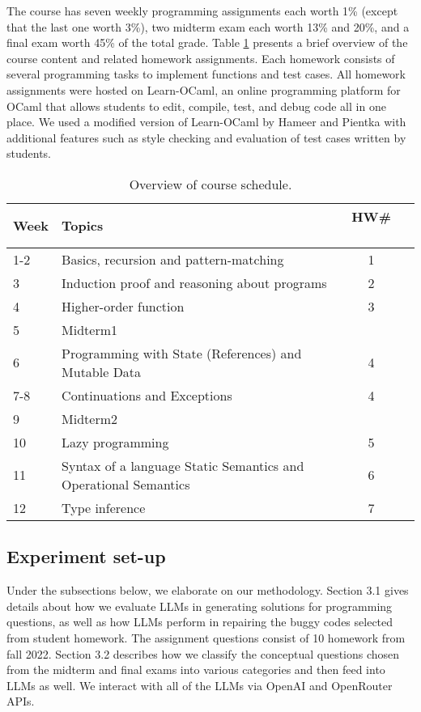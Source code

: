 The course has seven weekly programming assignments each worth 1\% (except that the last one worth 3\%), two midterm exam each worth 13\% and 20\%, and a final exam worth 45\% of the total grade. Table \ref{overview} presents a brief overview of the course content and related homework assignments. Each homework consists of several programming tasks to implement functions and test cases. All homework assignments were hosted on Learn-OCaml, an online programming platform for OCaml that allows students to edit, compile, test, and debug code all in one place. We used a modified version of Learn-OCaml \cite{10.1145/3341719} by Hameer and Pientka with additional features such as style checking and evaluation of test cases written by students.

\begin{table}[h!]
		\begin{tabular}{|l | l | c | l |} 
			
			\hline
			Week & Topics & HW\# \  \\ [0.3ex] 
			\hline
			1-2 & Basics, recursion and pattern-matching & 1\\ 
			\hline
			3 & Induction proof and reasoning about programs & 2\\ 
			\hline
			4 & Higher-order function & 3\\ 
			\hline
			5 & Midterm1  & \\ 
			\hline
			6 & Programming with State (References) and Mutable Data& 4\\ 
			\hline
			7-8 & Continuations and Exceptions  & 4\\ 
			\hline
			9 & Midterm2& \\ 
			\hline
			10 & Lazy programming & 5\\ 
			\hline
			11 & Syntax of a language Static Semantics and Operational Semantics& 6\\ 
			\hline
			12 & Type inference  & 7\\ 
			\hline
		\end{tabular}
	\caption{\label{overview}Overview of course schedule.}
\end{table}

\subsection{Experiment set-up}


Under the subsections below, we elaborate on our methodology. Section 3.1 gives details about how we evaluate LLMs in generating solutions for programming questions, as well as how LLMs perform in repairing the buggy codes selected from student homework. The assignment questions consist of 10 homework from fall 2022. Section 3.2 describes how we classify the conceptual questions chosen from the midterm and final exams into various categories and then feed into LLMs as well. We interact with all of the LLMs via OpenAI and OpenRouter APIs.


